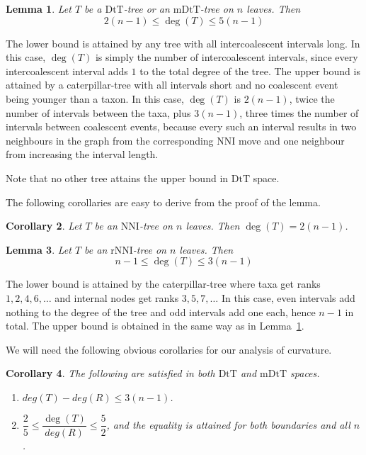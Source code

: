 \documentclass{amsart}
\newtheorem{lemma}{Lemma}
\newtheorem{corollary}[lemma]{Corollary}
\newcommand{\dts}{\mathrm{DtT}}
\newcommand{\nni}{\mathrm{NNI}}
\newcommand{\rnni}{\mathrm{rNNI}}
\newcommand{\mdts}{\mathrm{mDtT}}
\begin{document}
\begin{lemma}\label{neighBound}
Let $T$ be a $\dts$-tree or an $\mdts$-tree on $n$ leaves. Then \[2(n-1)\leq \deg(T)\leq5(n-1)\] 
\end{lemma}

\proof
The lower bound is attained by any tree with all intercoalescent intervals long. 
In this case, $\deg(T)$ is simply the number of intercoalescent intervals, since every intercoalescent interval adds $1$ to the total degree of the tree. 
The upper bound is attained by a caterpillar-tree with all intervals short and no coalescent event being younger than a taxon.
In this case, $\deg(T)$ is $2(n-1)$, twice the number of intervals between the taxa, plus $3(n-1)$, three times the number of intervals between coalescent events, because every such an interval results in two neighbours in the graph from the corresponding NNI move and one neighbour from increasing the interval length. 

Note that no other tree attains the upper bound in $\dts$ space. 
\endproof

The following corollaries are easy to derive from the proof of the lemma. 

\begin{corollary}
Let $T$ be an $\nni$-tree on $n$ leaves. Then $\deg(T) = 2(n-1)$. 
\end{corollary}

\begin{lemma}\label{cor_deg_rNNI}
Let $T$ be an $\rnni$-tree on $n$ leaves. Then \[n-1\leq \deg(T)\leq3(n-1)\] 
\end{lemma}

\proof
The lower bound is attained by the caterpillar-tree where taxa get ranks $1, 2, 4, 6, \ldots$ and internal nodes get ranks $3, 5, 7, \ldots$ 
In this case, even intervals add nothing to the degree of the tree and odd intervals add one each, hence $n-1$ in total. 
The upper bound is obtained in the same way as in Lemma~\ref{neighBound}.
\endproof

We will need the following obvious corollaries for our analysis of curvature. 

\begin{corollary}\label{degreeBounds}
The following are satisfied in both $\dts$ and $\mdts$ spaces. 
\begin{enumerate}[(1)]
\item $deg(T)-deg(R) \leq 3(n-1)$.
\item $\dfrac25 \leq \dfrac{\deg(T)}{deg(R)} \leq \dfrac52$, and the equality is attained for both boundaries and all $n$. 
\end{enumerate}
\end{corollary}
\end{document}

